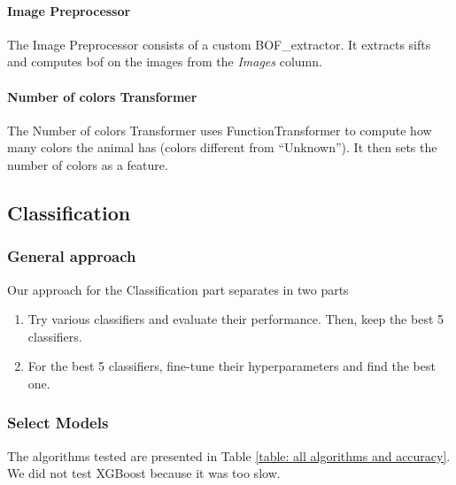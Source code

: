 \documentclass[12pt]{article}
\begin{document}
\paragraph{Image Preprocessor} The Image Preprocessor consists of a custom  BOF\_extractor. It extracts \glspl{sift} and computes \gls{bof} on the images from the \textit{Images} column.

\paragraph{Number of colors Transformer} The Number of colors Transformer uses FunctionTransformer to compute how many colors the animal has (\ie colors different from ``Unknown''). It then sets the number of colors as a feature.


\subsection{Classification}

\subsubsection{General approach}
Our approach for the Classification part separates in two parts
\begin{enumerate}
    \item Try various classifiers and evaluate their performance. Then, keep the best 5 classifiers.
    \item For the best 5 classifiers, fine-tune their hyperparameters and find the best one.
\end{enumerate}

\subsubsection{Select Models}
The algorithms tested are presented in Table \ref{table: all algorithms and accuracy}. We did not test XGBoost because it was too slow.
\end{document}
